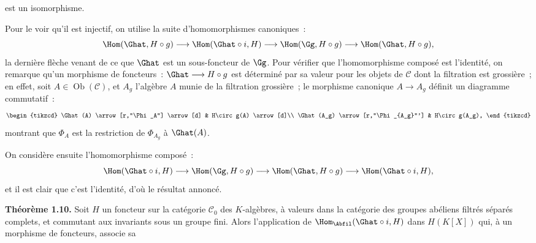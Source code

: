 est un
isomorphisme.

Pour le voir qu'il est injectif, on utilise la suite d'homomorphismes canoniques~:
\[
  \Hom(\Ghat,H\circ g)\longrightarrow
  \Hom(\Ghat\circ i,H)\longrightarrow
  \Hom(\Gg,H\circ g)\longrightarrow
  \Hom(\Ghat,H\circ g),
\]
la dernière flèche venant de ce que \(\Ghat\) est un sous-foncteur de \(\Gg\). Pour vérifier que l'homomorphisme composé est l'identité, on remarque qu'un morphisme de foncteurs~: \(\Ghat\longrightarrow H\circ g\) est déterminé par sa valeur pour les objets de \(\mathcal C\) dont la filtration est grossière~; en effet, soit \(A\in\operatorname{Ob}(\mathcal C)\), et \(A_g\) l'algèbre \(A\) munie de la filtration grossière~; le morphisme canonique \(A\to A_g\) définit un diagramme commutatif~:
\[
\begin{tikzcd}
\Ghat(A) \arrow[r,"\Phi_A"] \arrow[d] &
H\circ g(A) \arrow[d]\\
\Ghat(A_g) \arrow[r,"\Phi_{A_g}"'] &
H\circ g(A_g),
\end{tikzcd}
\]
montrant que \(\Phi_A\) est la restriction de \(\Phi_{A_g}\) à \(\Ghat(A)\).

On considère ensuite l'homomorphisme composé~:
\[
  \Hom(\Ghat\circ i,H)\longrightarrow
  \Hom(\Gg,H\circ g)\longrightarrow
  \Hom(\Ghat,H\circ g)\longrightarrow
  \Hom(\Ghat\circ i,H),
\]
et il est clair que c'est l'identité, d'où le résultat annoncé.

\textbf{Théorème 1.10.} Soit \(H\) un foncteur sur la catégorie \(\mathcal C_0\) des \(K\)-algèbres, à valeurs dans la catégorie des groupes abéliens filtrés séparés complets, et commutant aux invariants sous un groupe fini. Alors l'application de \(\Hom_{\Abfil}(\Ghat\circ i,H)\) dans \(H(K[X])\) qui, à un morphisme de foncteurs, associe sa
